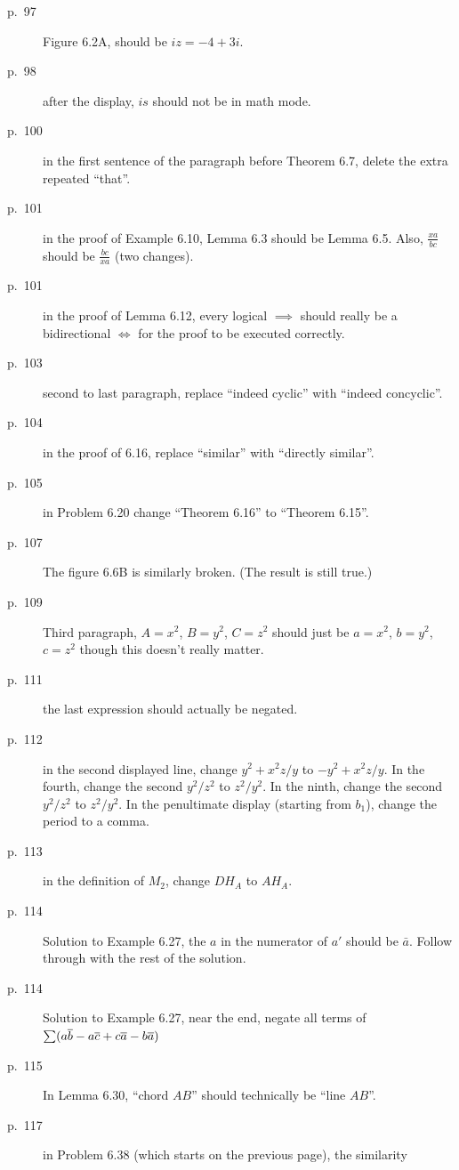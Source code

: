 \documentclass[11pt]{scrartcl}
\begin{document}
\begin{description}
\item[p.\  97] Figure 6.2A, should be $iz = -4+3i$.
\item[p.\  98] after the display, $is$ should not be in math mode.
\item[p.\  100] in the first sentence of the paragraph before Theorem 6.7,
  delete the extra repeated ``that''.
\item[p.\  101] in the proof of Example 6.10, Lemma 6.3 should be Lemma 6.5.
  Also, $\frac{xa}{bc}$ should be $\frac{bc}{xa}$ (two changes).
\item[p.\  101] in the proof of Lemma 6.12, every logical $\implies$ should
  really be a bidirectional $\iff$ for the proof to be executed correctly.
\item[p.\  103] second to last paragraph, replace ``indeed cyclic'' with ``indeed concyclic''.
\item[p.\  104] in the proof of 6.16, replace ``similar'' with ``directly similar''.
\item[p.\  105] in Problem 6.20 change ``Theorem 6.16'' to ``Theorem 6.15''.
\item[p.\  107] 
  The figure 6.6B is similarly broken.
  (The result is still true.)
\item[p.\  109] Third paragraph, $A=x^2$, $B=y^2$, $C=z^2$
  should just be $a=x^2$, $b=y^2$, $c=z^2$ though this doesn't really matter.
\item[p.\  111] the last expression should actually be negated.
\item[p.\  112] in the second displayed line, change $y^2+x^2z/y$ to $-y^2+x^2z/y$.
  In the fourth, change the second $y^2/z^2$ to $z^2/y^2$.
  In the ninth, change the second $y^2/z^2$ to $z^2/y^2$.
  In the penultimate display (starting from $b_1$), change the period to a comma.
\item[p.\  113] in the definition of $M_2$, change $DH_A$ to $AH_A$.
\item[p.\  114] Solution to Example 6.27, the $a$ in the numerator of $a'$ should be $\bar a$.
  Follow through with the rest of the solution.
\item[p.\  114] Solution to Example 6.27, near the end, negate all terms of
  $\sum (a \overline b - a \overline c + c \overline a - b \overline a)$
\item[p.\  115] In Lemma 6.30, ``chord $AB$'' should technically be ``line $AB$''.
\item[p.\  117] in Problem 6.38 (which starts on the previous page), the similarity

\end{description}
\end{document}
